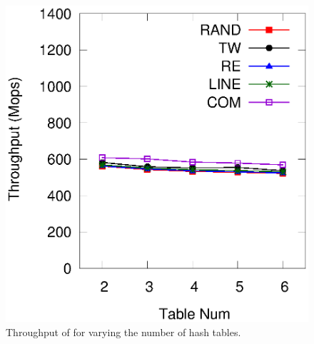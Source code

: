 \begin{figure}[t]
\begin{minipage}{0.48\linewidth}
		\includegraphics[width=\linewidth]{pic/tunning/tunning-search.eps}
		\centerline{}
	\end{minipage}
	\caption{Throughput of \voter for varying the number of hash tables.}
	\label{fig:vary-table}
\end{figure}
%
